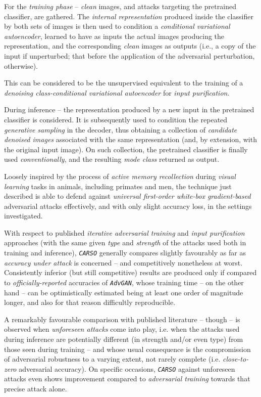 For the \textit{training phase} – \textit{clean} images, and attacks targeting the pretrained classifier, are gathered. The \textit{internal representation} produced inside the classifier by both sets of images is then used to condition a \textit{conditional variational autoencoder}, learned to have as inputs the actual images producing the representation, and the corresponding \textit{clean} images as outputs (i.e., a copy of the input if unperturbed; that before the application of the adversarial perturbation, otherwise).

This can be considered to be the unsupervised equivalent to the training of a \textit{denoising class-conditional variational autoencoder} for \textit{input purification}.

During inference – the representation produced by a new input in the pretrained classifier is considered. It is subsequently used to condition the repeated \textit{generative sampling} in the decoder, thus obtaining a collection of \textit{candidate denoised images} associated with the same representation (and, by extension, with the original input image). On such collection, the pretrained classifier is finally used \textit{conventionally}, and the resulting \textit{mode class} returned as output.

Loosely inspired by the process of \textit{active memory recollection} during \textit{visual learning} tasks in animals, including primates and men, the technique just described is able to defend against \textit{universal first-order white-box gradient-based} adversarial attacks effectively, and with only slight accuracy loss, in the settings investigated.

With respect to published \textit{iterative adversarial training} and \textit{input purification} approaches (with the same given \textit{type} and \textit{strength} of the attacks used both in training and inference), \textit{\texttt{CARSO}} generally compares slightly favourably as far as \textit{accuracy under attack} is concerned – and competitively nonetheless at worst. Consistently inferior (but still competitive) results are produced only if compared to \textit{officially-reported} accuracies of \textit{\texttt{AdvGAN}}, whose training time – on the other hand – can be optimistically estimated being at least one order of magnitude longer, and also for that reason difficultly reproducible.

A remarkably favourable comparison with published literature – though – is observed when \textit{unforeseen attacks} come into play, i.e. when the attacks used during inference are potentially different (in strength and/or even type) from those seen during training – and whose usual consequence is the compromission of adversarial robustness to a varying extent, not rarely complete (i.e. \textit{close-to-zero} adversarial accuracy). On specific occasions, \textit{\texttt{CARSO}} against unforeseen attacks even shows improvement compared to \textit{adversarial training} towards that precise attack alone.

